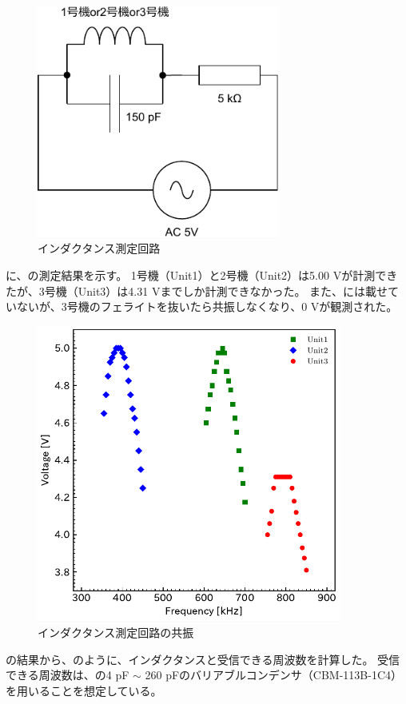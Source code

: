 \documentclass[report.tex]{subfiles}
\begin{document}
\begin{figure}[H]
	\centering
	\includegraphics[width=8cm]{fig/inda.pdf}
	\caption{インダクタンス測定回路}
	\label{fig:inda}
\end{figure}

に、の測定結果を示す。
1号機（Unit1）と2号機（Unit2）は5.00 Vが計測できたが、3号機（Unit3）は4.31 Vまでしか計測できなかった。
また、には載せていないが、3号機のフェライトを抜いたら共振しなくなり、0 Vが観測された。

\begin{figure}[H]
	\centering
	\includegraphics[width=10cm]{fig/inda_inda.pdf}
	\caption{インダクタンス測定回路の共振}
	\label{fig:inda2}
\end{figure}

の結果から、のように、インダクタンスと受信できる周波数を計算した。
受信できる周波数は、の4 pF \(\sim\) 260 pFのバリアブルコンデンサ（CBM-113B-1C4）を用いることを想定している。
\end{document}
